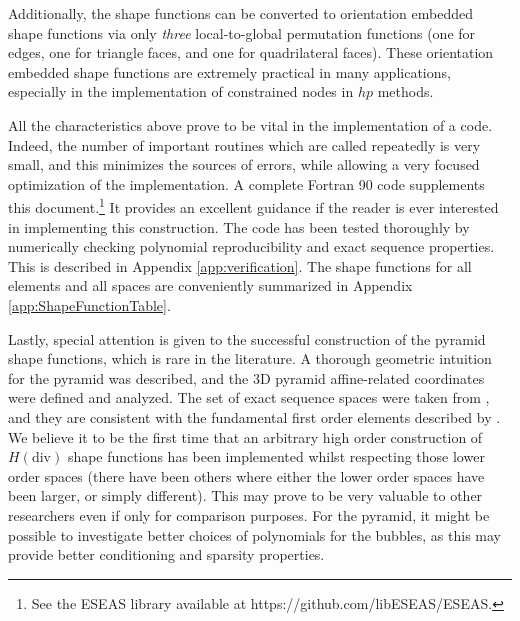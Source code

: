 Additionally, the shape functions can be converted to orientation embedded shape functions via only \textit{three} local-to-global permutation functions (one for edges, one for triangle faces, and one for quadrilateral faces).
These orientation embedded shape functions are extremely practical in many applications, especially in the implementation of constrained nodes in $hp$ methods.

All the characteristics above prove to be vital in the implementation of a code.
Indeed, the number of important routines which are called repeatedly is very small, and this minimizes the sources of errors, while allowing a very focused optimization of the implementation.
A complete Fortran 90 code supplements this document.\footnote{See the ESEAS library available at https://github.com/libESEAS/ESEAS.}
It provides an excellent guidance if the reader is ever interested in implementing this construction.  
The code has been tested thoroughly by numerically checking polynomial reproducibility and exact sequence properties.
This is described in Appendix \ref{app:verification}.
The shape functions for all elements and all spaces are conveniently summarized in Appendix \ref{app:ShapeFunctionTable}.


Lastly, special attention is given to the successful construction of the pyramid shape functions, which is rare in the literature.
A thorough geometric intuition for the pyramid was described, and the 3D pyramid affine-related coordinates were defined and analyzed.
The set of exact sequence spaces were taken from \citet{Nigam_Phillips_11}, and they are consistent with the fundamental first order elements described by \citet{Hiptmair99}.
We believe it to be the first time that an arbitrary high order construction of $H(\mathrm{div})$ shape functions has been implemented whilst respecting those lower order spaces (there have been others where either the lower order spaces have been larger, or simply different).
This may prove to be very valuable to other researchers even if only for comparison purposes.
For the pyramid, it might be possible to investigate better choices of polynomials for the bubbles, as this may provide better conditioning and sparsity properties.

